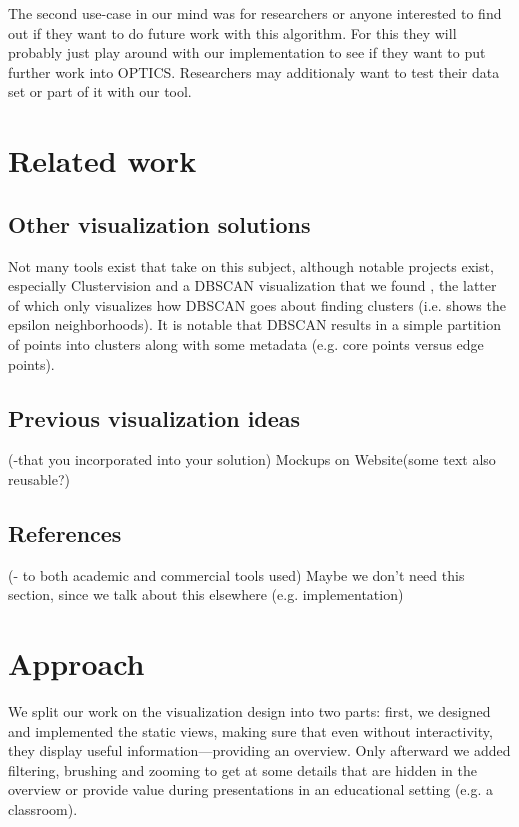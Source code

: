 \documentclass{vgtc}                          %
\begin{document}
The second use-case in our mind was for researchers or anyone interested to find out if they want to do future work with this algorithm. For this they will probably just play around with our implementation to see if they want to put further work into OPTICS. Researchers may additionaly want to test their data set or part of it with our tool.



\section{Related work} %

\subsection{Other visualization solutions}
 Not many tools exist that take on this subject, although notable projects exist, especially Clustervision\cite{Clustervision} and a DBSCAN visualization that we found \cite{DBSCAN}, the latter of which only visualizes how DBSCAN goes about finding clusters (i.e. shows the epsilon neighborhoods). It is notable that DBSCAN results in a simple partition of points into clusters along with some metadata (e.g. core points versus edge points).
\subsection{Previous visualization ideas}
(-that you incorporated into your solution)
Mockups on Website(some text also reusable?)
\subsection{References}
(- to both academic and commercial tools used)
Maybe we don't need this section, since we talk about this elsewhere (e.g. implementation)



\section{Approach} %

We split our work on the visualization design into two parts: first, we
designed and implemented the static views, making sure that even without
interactivity, they display useful information---providing an overview. Only
afterward we added filtering, brushing and zooming to get at some details that
are hidden in the overview or provide value during presentations in an
educational setting (e.g. a classroom).
\end{document}
